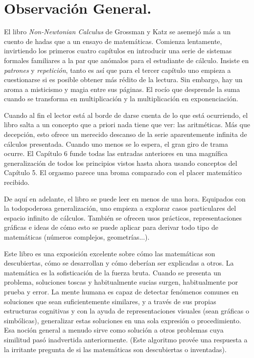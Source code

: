 \section{Observación General.}

El libro \textit{Non-Newtonian Calculus} de Grossman y Katz se asemejó más a un cuento de hadas que a un ensayo de matemáticas. Comienza lentamente, invirtiendo los primeros cuatro capítulos en introducir una serie de sistemas formales familiares a la par que anómalos para el estudiante de cálculo. Insiste en \textit{patrones} y \textit{repetición}, tanto es así que para el tercer capítulo uno empieza a cuestionarse si es posible obtener más rédito de la lectura. Sin embargo, hay un aroma a misticismo y magia entre sus páginas. El rocío que desprende la suma cuando se transforma en multiplicación y la multiplicación en exponenciación.

Cuando al fin el lector está al borde de darse cuenta de lo que está ocurriendo, el libro salta a un concepto que a priori nada tiene que ver: las aritméticas. Más que decepción, esto ofrece un merecido descanso de la serie aparentemente infinita de cálculos presentada. Cuando uno menos se lo espera, el gran giro de trama ocurre. El Capítulo 6 funde todas las entradas anteriores en una magnífica generalización de todos los principios vistos hasta ahora usando conceptos del Capítulo 5. El orgasmo parece una broma comparado con el placer matemático recibido. 

De aquí en adelante, el libro se puede leer en menos de una hora. Equipados con la todopoderosa generalización, uno empieza a explorar casos particulares del espacio infinito de cálculos. También se ofrecen usos prácticos, representaciones gráficas e ideas de cómo esto se puede aplicar para derivar todo tipo de matemáticas (números complejos, geometrías...).

Este libro es una exposición excelente sobre cómo las matemáticas son descubiertas, cómo se desarrollan y cómo deberían ser explicadas a otros. La matemática es la sofisticación de la fuerza bruta. Cuando se presenta un problema, soluciones toscas y habitualmente sucias surgen, habitualmente por prueba y error. La mente humana es capaz de detectar fenómenos comunes en soluciones que sean suficientemente similares, y a través de sus propias estructuras cognitivas y con la ayuda de representaciones visuales (sean gráficas o simbólicas), generalizar estas soluciones en una sola expresión o procedimiento. Esa noción general a menudo sirve como solución a otros problemas cuya similitud pasó inadvertida anteriormente. (Este algoritmo provée una respuesta a la irritante pregunta de si las matemáticas son descubiertas o inventadas).

